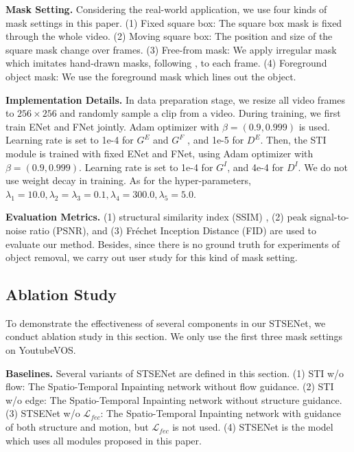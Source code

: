 \noindent \textbf{Mask Setting.} Considering the real-world application, we use four kinds of mask settings in this paper. (1) Fixed square box: The square box mask is fixed through the whole video. (2) Moving square box: The position and size of the square mask change over frames. (3) Free-from mask: We apply irregular mask which imitates hand-drawn masks, following \cite{liu2018partialinpainting}, to each frame. (4) Foreground object mask: We use the foreground mask which lines out the object.

\noindent \textbf{Implementation Details.} In data preparation stage, we resize all video frames to $256\times256$ and randomly sample a clip from a video. 
During training, we first train ENet and FNet jointly. Adam optimizer with $\beta=(0.9, 0.999)$ is used. Learning rate is set to 1e-4 for $G^E$ and $G^F$ , and 1e-5 for $D^E$. Then, the STI module is trained with fixed ENet and FNet, using Adam optimizer with $\beta=(0.9, 0.999)$. Learning rate is set to 1e-4 for $G^I$, and 4e-4 for $D^I$. We do not use weight decay in training.
As for the hyper-parameters, $\lambda_1=10.0,\lambda_2=\lambda_3=0.1,\lambda_4=300.0,\lambda_5=5.0$.

\noindent \textbf{Evaluation Metrics.} (1) structural similarity index (SSIM) \cite{wang2004image}, (2) peak signal-to-noise ratio (PSNR), and (3) Fr{\'e}chet Inception Distance (FID) \cite{heusel2017gans} are used to evaluate our method. 
Besides, since there is no ground truth for experiments of object removal, we carry out user study for this kind of mask setting. 


\subsection{Ablation Study}
To demonstrate the effectiveness of several components in our STSENet, we conduct ablation study in this section. We only use the first three mask settings on YoutubeVOS.

\noindent \textbf{Baselines.} Several variants of STSENet are defined in this section. (1) STI w/o flow: The Spatio-Temporal Inpainting network without flow guidance. (2) STI w/o edge: The Spatio-Temporal Inpainting network without structure guidance. (3) STSENet w/o $\mathcal{L}_{fec}$: The Spatio-Temporal Inpainting network with guidance of both structure and motion, but $\mathcal{L}_{fec}$ is not used. (4) STSENet is the model which uses all modules proposed in this paper. 



